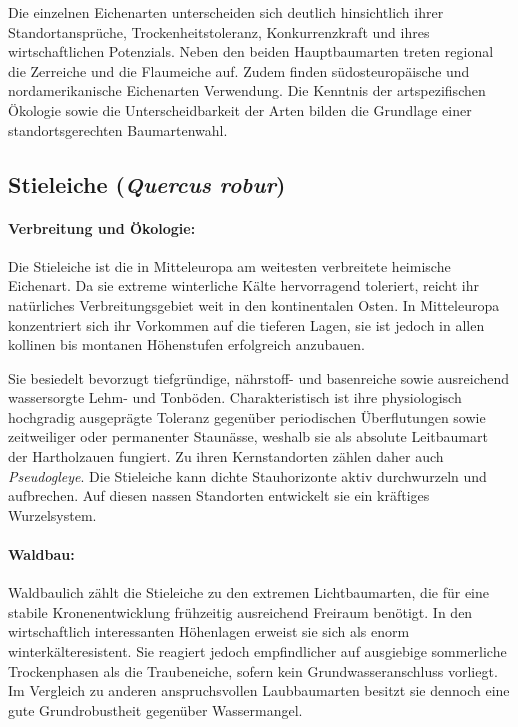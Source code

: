 \documentclass[twocolumn, bibliography=totoc, abstract=true]{scrartcl}
\begin{document}
Die einzelnen Eichenarten unterscheiden sich deutlich hinsichtlich ihrer Standortansprüche, Trockenheitstoleranz, Konkurrenzkraft und ihres wirtschaftlichen Potenzials. Neben den beiden Hauptbaumarten treten regional die Zerreiche und die Flaumeiche auf. Zudem finden südosteuropäische und nordamerikanische Eichenarten Verwendung. Die Kenntnis der artspezifischen Ökologie sowie die Unterscheidbarkeit der Arten bilden die Grundlage einer standortsgerechten Baumartenwahl.

\subsection{Stieleiche (\textit{Quercus robur})}

\paragraph{Verbreitung und Ökologie:} 
Die Stieleiche ist die in Mitteleuropa am weitesten verbreitete heimische Eichenart. Da sie extreme winterliche Kälte hervorragend toleriert, reicht ihr natürliches Verbreitungsgebiet weit in den kontinentalen Osten. In Mitteleuropa konzentriert sich ihr Vorkommen auf die tieferen Lagen, sie ist jedoch in allen kollinen bis montanen Höhenstufen erfolgreich anzubauen. 

Sie besiedelt bevorzugt tiefgründige, nährstoff- und basenreiche sowie ausreichend wassersorgte Lehm- und Tonböden. Charakteristisch ist ihre physiologisch hochgradig ausgeprägte Toleranz gegenüber periodischen Überflutungen sowie zeitweiliger oder permanenter Staunässe, weshalb sie als absolute Leitbaumart der Hartholzauen fungiert. Zu ihren Kernstandorten zählen daher auch \emph{Pseudogleye}. Die Stieleiche kann dichte Stauhorizonte aktiv durchwurzeln und aufbrechen. Auf diesen nassen Standorten entwickelt sie ein kräftiges Wurzelsystem.

\paragraph{Waldbau:} 
Waldbaulich zählt die Stieleiche zu den extremen Lichtbaumarten, die für eine stabile Kronenentwicklung frühzeitig ausreichend Freiraum benötigt. In den wirtschaftlich interessanten Höhenlagen erweist sie sich als enorm winterkälteresistent. Sie reagiert jedoch empfindlicher auf ausgiebige sommerliche Trockenphasen als die Traubeneiche, sofern kein Grundwasseranschluss vorliegt. Im Vergleich zu anderen anspruchsvollen Laubbaumarten besitzt sie dennoch eine gute Grundrobustheit gegenüber Wassermangel. 
\end{document}
